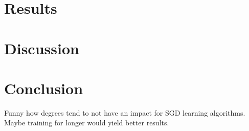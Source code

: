 \documentclass[10pt,conference,compsocconf]{IEEEtran}
\begin{document}
\section{Results}

\section{Discussion}

\section{Conclusion}
Funny how degrees tend to not have an impact for SGD learning algorithms.
Maybe training for longer would yield better results.




\end{document}
